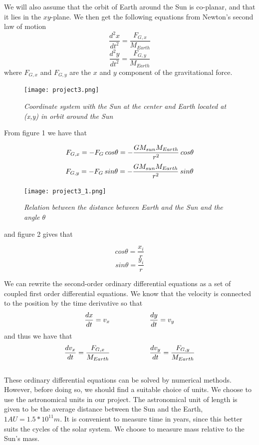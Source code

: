\documentclass[a4paper,12pt, english]{article}
\begin{document}
We will also assume that the orbit of Earth around the Sun is co-planar, and that it lies in the $xy$-plane. We  then get the following equations from Newton's second law of motion
$$\frac{d^2x}{dt^2} = \frac{F_{G,x}}{M_{Earth}}$$
$$\frac{d^2y}{dt^2} = \frac{F_{G,y}}{M_{Earth}}$$
where $F_{G,x}$ and $F_{G,y}$ are the $x$ and $y$ component of the gravitational force. 


\begin{figure}[h!]
  \centering
    	  \texttt{[image: project3.png]}
  \caption{\textit{Coordinate system with the Sun at the center and Earth located at (x,y) in orbit around the Sun}}
\end{figure}


From figure 1 we have that

$$F_{G,x} = - F_G  \hspace{0.7 mm} cos \theta = - \frac{GM_{sun}M_{Earth}}{r^2} \hspace{0.7 mm} cos \theta $$
$$F_{G,y} = - F_G \hspace{0.7 mm} sin \theta = - \frac{GM_{sun}M_{Earth}}{r^2} \hspace{0.7 mm} sin \theta $$


\begin{figure}[h!]
  \centering
    \texttt{[image: project3\_1.png]}
  \caption{\textit{Relation between the distance between Earth and the Sun and the angle $\theta$}}
\end{figure}

and figure 2 gives that

$$ cos \theta = \frac{x_i}{r} $$
$$ sin \theta = \frac{y_i}{r} $$

We can rewrite the second-order ordinary differential equations as a set of coupled first order differential equations. 
We know that the velocity is connected to the position by the time derivative so that \\
$$ \frac{dx}{dt} = v_x \hspace{20 mm} \frac{dy}{dt} = v_y$$
and thus we have that \\

$$ \frac{dv_x}{dt} = \frac{F_{G,x}}{M_{Earth}} \hspace{20 mm} \frac{dv_y}{dt} = \frac{F_{G,y}}{M_{Earth}} $$
\\

These ordinary differential equations can be solved by numerical methods. However, before doing so, we should find a suitable choice of units. We choose to use the astronomical units in our project. The astronomical unit of length is given to be the average distance between the Sun and the Earth, $1 AU = 1.5*10^{11} m$. It is convenient to measure time in years, since this better suits the cycles of the solar system. We choose to measure mass relative to the Sun's mass.
\end{document}

